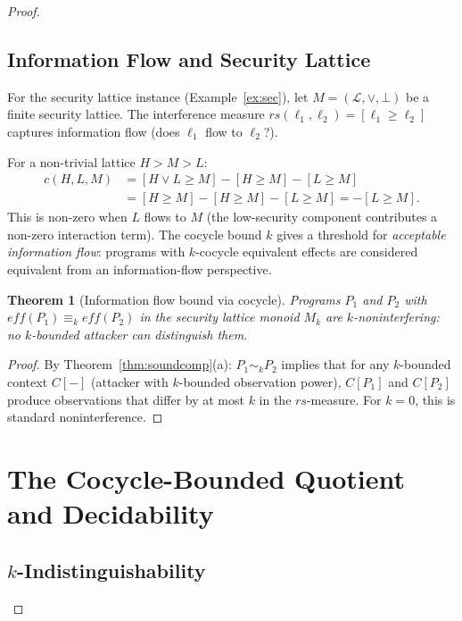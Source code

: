 \documentclass[acmsmall,sigplan,anonymous,review,screen]{acmart}
\theoremstyle{plain}
\newtheorem{theorem}{Theorem}[section]
\theoremstyle{definition}
\newcommand{\rs}{\mathit{rs}}
\begin{document}
\begin{proof}
\subsection{Information Flow and Security Lattice}
\label{sec:applications:sec}

For the security lattice instance (Example~\ref{ex:sec}), let
$M = (\mathcal{L}, \vee, \bot)$ be a finite security lattice.  The
interference measure $\rs(\ell_1, \ell_2) = [\ell_1 \geq \ell_2]$ captures
information flow (does $\ell_1$ flow to $\ell_2$?).

For a non-trivial lattice $H > M > L$:
\begin{align*}
  c(H, L, M) &= [H \vee L \geq M] - [H \geq M] - [L \geq M] \\
  &= [H \geq M] - [H \geq M] - [L \geq M] = -[L \geq M].
\end{align*}
This is non-zero when $L$ flows to $M$ (the low-security component
contributes a non-zero interaction term).  The cocycle bound $k$ gives a
threshold for \emph{acceptable information flow}: programs with
$k$-cocycle equivalent effects are considered equivalent from an
information-flow perspective.

\begin{theorem}[Information flow bound via cocycle]
  Programs $P_1$ and $P_2$ with $\mathit{eff}(P_1) \equiv_k \mathit{eff}(P_2)$
  in the security lattice monoid $M_k$ are $k$-noninterfering: no
  $k$-bounded attacker can distinguish them.
\end{theorem}
\begin{proof}
  By Theorem~\ref{thm:soundcomp}(a): $P_1 \sim_k P_2$ implies that for
  any $k$-bounded context $C[-]$ (attacker with $k$-bounded observation
  power), $C[P_1]$ and $C[P_2]$ produce observations that differ by at
  most $k$ in the $\rs$-measure.  For $k = 0$, this is standard noninterference.
\end{proof}

\section{The Cocycle-Bounded Quotient and Decidability}
\label{sec:decidability}

\subsection{$k$-Indistinguishability}
\label{sec:decidability:kindist}


\end{proof}
\end{document}
